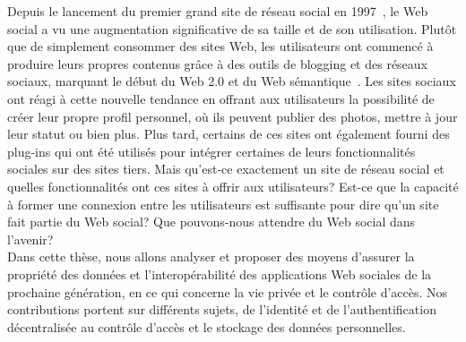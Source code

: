Depuis le lancement du premier grand site de réseau social en 1997~\cite{ellison2007social}, le Web social a vu une augmentation significative de sa taille et de son utilisation. Plutôt que de simplement consommer des sites Web, les utilisateurs ont commencé à produire leurs propres contenus grâce à des outils de blogging et des réseaux sociaux, marquant le début du Web 2.0 et du Web sémantique~\cite{berners1999weaving}. Les sites sociaux ont réagi à cette nouvelle tendance en offrant aux utilisateurs la possibilité de créer leur propre profil personnel, où ils peuvent publier des photos, mettre à jour leur statut ou bien plus. Plus tard, certains de ces sites ont également fourni des plug-ins qui ont été utilisés pour intégrer certaines de leurs fonctionnalités sociales sur des sites tiers. Mais qu'est-ce exactement un site de réseau social et quelles fonctionnalités ont ces sites à offrir aux utilisateurs? Est-ce que la capacité à former une connexion entre les utilisateurs est suffisante pour dire qu'un site fait partie du Web social? Que pouvons-nous attendre du Web social dans l'avenir?\\


Dans cette thèse, nous allons analyser et proposer des moyens d'assurer la propriété des données et l'interopérabilité des applications Web sociales de la prochaine génération, en ce qui concerne la vie privée et le contrôle d'accès. Nos contributions portent sur différents sujets, de l'identité et de l'authentification décentralisée au contrôle d'accès et le stockage des données personnelles.


